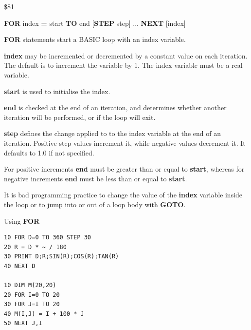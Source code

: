 \begin{description}[leftmargin=2cm,style=nextline]
\item [Token:] \$81
\item [Format:] {\bf FOR} index {\bf=} start {\bf TO} end
		[{\bf STEP} step] ... {\bf NEXT} [index]
\item [Usage:] {\bf FOR} statements start
               a BASIC loop with an index variable.

               {\bf index} may be incremented or decremented
               by a constant value on each iteration. The default
               is to increment the variable by 1.
               The index variable must be a real variable.

               {\bf start} is used to initialise the index.

               {\bf end} is checked at the end of an iteration,
               and determines whether another iteration will be performed,
               or if the loop will exit.

               {\bf step} defines the change applied to
               to the index variable at the end of an iteration.
               Positive step values increment it, while negative values
               decrement it. It defaults to 1.0 if not specified.

\item [Remarks:] For positive increments {\bf end} must be greater than
               or equal to {\bf start}, whereas for negative increments
               {\bf end} must be less than or equal to {\bf start}.

               It is bad programming practice to change the value
               of the {\bf index} variable inside the loop or to
               jump into or out of a loop body with {\bf GOTO}.

\item [Examples:] Using {\bf FOR}
\begin{tcolorbox}[colback=black,coltext=white]
\verbatimfont{\codefont}
\begin{verbatim}
10 FOR D=0 TO 360 STEP 30
20 R = D * ~ / 180
30 PRINT D;R;SIN(R);COS(R);TAN(R)
40 NEXT D

10 DIM M(20,20)
20 FOR I=0 TO 20
30 FOR J=I TO 20
40 M(I,J) = I + 100 * J
50 NEXT J,I
\end{verbatim}
\end{tcolorbox}
\end{description}


